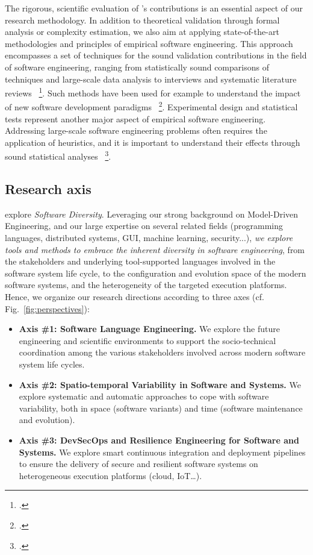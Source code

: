 The rigorous, scientific evaluation of \team{}'s contributions is an essential aspect of our research methodology. In addition to theoretical validation through formal analysis or complexity estimation, we also aim at applying state-of-the-art methodologies and principles of empirical software engineering. This approach encompasses a set of techniques for the sound validation contributions in the field of software engineering, ranging from statistically sound comparisons of techniques and large-scale data analysis to interviews and systematic literature reviews~ \footcite{shull2008guide, runeson2009guidelines}. Such methods have been used for example to understand the impact of new software development paradigms~ \footcite{briand1999empirical}. Experimental design and statistical tests represent another major aspect of empirical software engineering.  Addressing large-scale software engineering problems often requires the application of heuristics, and it is important to understand their effects through sound statistical analyses~ \footcite{ArcuriB11}.


\subsection{Research axis}
\label{fondements:axis}

\team{} explore \emph{Software Diversity}. 
Leveraging our strong background on Model-Driven Engineering, and our large expertise on several related fields (programming languages, distributed systems, GUI, machine learning, security...), \emph{we explore tools and methods to embrace the inherent diversity in software engineering}, from the stakeholders and underlying tool-supported languages involved in the software system life cycle, to the configuration and evolution space of the modern software systems, and the heterogeneity of the targeted execution platforms. Hence, we organize our research directions according to three axes (cf. Fig.~\ref{fig:perspectives}): 
\begin{itemize}
\item \textbf{Axis \#1: Software Language Engineering.} We explore the future engineering and scientific environments to support the socio-technical coordination among the various stakeholders involved across modern software system life cycles. 
\item \textbf{Axis \#2: Spatio-temporal Variability in Software and Systems.} We explore systematic and automatic approaches to cope with software variability, both in space (software variants) and time (software maintenance and evolution). 
\item \textbf{Axis \#3: DevSecOps and Resilience Engineering for Software and Systems.} We explore smart continuous integration and deployment pipelines to ensure the delivery of secure and resilient software systems on heterogeneous execution platforms (cloud, IoT\ldots).
\end{itemize}

